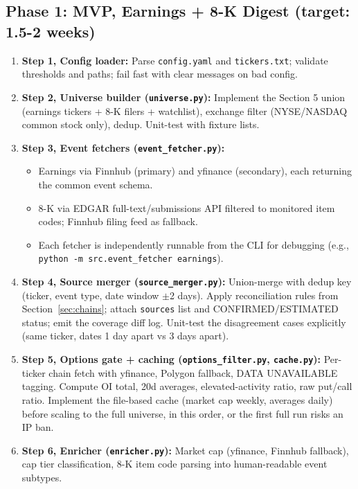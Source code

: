 \documentclass[11pt]{article}
\begin{document}
\subsection{Phase 1: MVP, Earnings + 8-K Digest \hfill {\small (target: 1.5-2 weeks)}}

\begin{enumerate}
  \item \textbf{Step 1, Config loader:} Parse \texttt{config.yaml} and \texttt{tickers.txt}; validate thresholds and paths; fail fast with clear messages on bad config.
  \item \textbf{Step 2, Universe builder (\texttt{universe.py}):} Implement the Section 5 union (earnings tickers + 8-K filers + watchlist), exchange filter (NYSE/NASDAQ common stock only), dedup. Unit-test with fixture lists.
  \item \textbf{Step 3, Event fetchers (\texttt{event\_fetcher.py}):}
    \begin{itemize}
      \item Earnings via Finnhub (primary) and yfinance (secondary), each returning the common event schema.
      \item 8-K via EDGAR full-text/submissions API filtered to monitored item codes; Finnhub filing feed as fallback.
      \item Each fetcher is independently runnable from the CLI for debugging (e.g., \texttt{python -m src.event\_fetcher earnings}).
    \end{itemize}
  \item \textbf{Step 4, Source merger (\texttt{source\_merger.py}):} Union-merge with dedup key (ticker, event type, date window $\pm$2 days). Apply reconciliation rules from Section~\ref{sec:chains}; attach \texttt{sources} list and CONFIRMED/ESTIMATED status; emit the coverage diff log. Unit-test the disagreement cases explicitly (same ticker, dates 1 day apart vs 3 days apart).
  \item \textbf{Step 5, Options gate + caching (\texttt{options\_filter.py}, \texttt{cache.py}):} Per-ticker chain fetch with yfinance, Polygon fallback, DATA UNAVAILABLE tagging. Compute OI total, 20d averages, elevated-activity ratio, raw put/call ratio. Implement the file-based cache (market cap weekly, averages daily) before scaling to the full universe, in this order, or the first full run risks an IP ban.
  \item \textbf{Step 6, Enricher (\texttt{enricher.py}):} Market cap (yfinance, Finnhub fallback), cap tier classification, 8-K item code parsing into human-readable event subtypes.

\end{enumerate}
\end{document}
